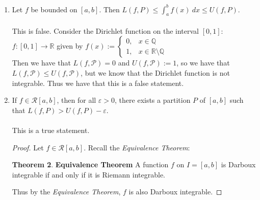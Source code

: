 \documentclass[12pt,letterpaper]{article}
\newcommand{\R}{\mathbb{R}}
\newcommand{\Q}{\mathbb{Q}}
\theoremstyle{case}
\theoremstyle{definition}
\newtheorem*{theorem*}{Theorem}
\begin{document}
\begin{enumerate}
\begin{enumerate}
			\\\\This is true since if $f \in \mathcal{R}[a,b]$, and if we let $I:=[a,b]$, then $f$ is Darboux integrable, by the \textit{Equivalence Theorem}. Then, by the definition of the Darboux integral, $U(f)=\inf \{U(f,\mathcal{P}) : \mathcal{P} \in \mathscr{P}(I)\}$ and $L(f) := \sup \{L(f,\mathcal{P}) : \mathcal{P} \in \mathscr{P}(I)\}$, and by \textit{Theorem 7.1.1}:
			\begin{theorem*}
				If $f \in \mathcal{R}[a,b]$, then the value of the integral is uniquely determined.
			\end{theorem*}
			, we have that the value $L$ of $\displaystyle\int_{a}^{b} f(x)\ dx=L$ is uniquely determined for all partitions $\mathcal{P} \in \mathscr{P}(I)$.
			\\\\That is, this statement is a combination of \textit{Theorem 7.4.1} and \textit{Theorem 7.1.2}.\\
			\item Let $f$ be bounded on $[a,b]$. Then $L(f,P) \leq \displaystyle\int_{a}^{b} f(x)\ dx \leq U(f,P)$.
			\\\\This is false. Consider the Dirichlet function on the interval $[0,1]$: $f:[0,1] \to \R$ given by $f(x):=\begin{cases}
			0, &x \in \Q \\
			1, &x \in \R\setminus\Q
			\end{cases}$\\
			Then we have that $L(f,\mathcal{P}) = 0$ and $U(f,\mathcal{P}):=1$, so we have that $L(f,\mathcal{P}) \leq U(f,\mathcal{P})$, but we know that the Dirichlet function is not integrable. Thus we have that this is a false statement.\\
			\item If $f \in \mathcal{R}[a,b]$, then for all $\varepsilon > 0$, there exists a partition $P$ of $[a,b]$ such that $L(f,P) > U(f,P)-\varepsilon$.
			\\\\This is a true statement.
			\begin{proof}
				Let $f \in \mathcal{R}[a,b]$. Recall the \textit{Equivalence Theorem}:
				\begin{theorem*}{\textbf{Equivalence Theorem}}
					A function $f$ on $I=[a,b]$ is Darboux integrable if and only if it is Riemann integrable.
				\end{theorem*}
				Thus by the \textit{Equivalence Theorem}, $f$ is also Darboux integrable.

\end{proof}
\end{enumerate}
\end{enumerate}
\end{document}
